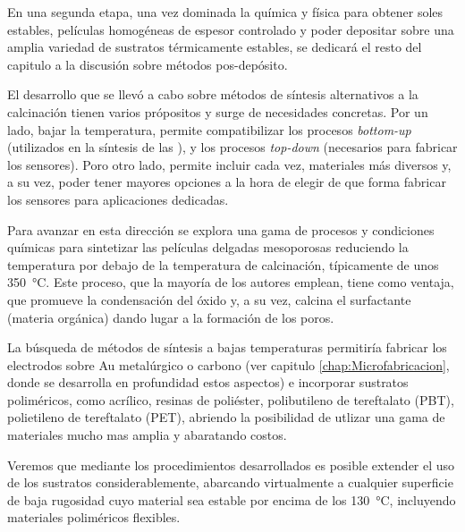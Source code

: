 	En una segunda etapa, una vez dominada la química y física para obtener soles estables, películas homogéneas de espesor controlado y poder depositar sobre una amplia variedad de sustratos térmicamente estables, se dedicará el resto del capitulo a la discusión sobre métodos pos-depósito. 

	El desarrollo que se llevó a cabo sobre métodos de síntesis alternativos a la calcinación tienen varios própositos y surge de necesidades concretas. Por un lado, bajar la temperatura, permite compatibilizar los procesos \textit{bottom-up} (utilizados en la síntesis de las \pdm), y los procesos \textit{top-down} (necesarios para fabricar los sensores). Poro otro lado, permite incluir cada vez, materiales más diversos y, a su vez, poder tener mayores opciones a la hora de elegir de que forma fabricar los sensores para aplicaciones dedicadas\cite{Doshi2000a,Wagner2013,Innocenzi2013,Soler-Illia2002a}.

	Para avanzar en esta dirección se explora una gama de procesos y condiciones químicas para sintetizar las películas delgadas mesoporosas reduciendo la temperatura por debajo de la temperatura de calcinación, típicamente de unos \SI{350}{\celsius}. Este proceso, que la mayoría de los autores emplean, tiene como ventaja, que promueve la condensación del óxido y, a su vez, calcina el surfactante (materia orgánica) dando lugar a la formación de los poros.\cite{Zhang2015,Horiuchi2011,Clark2000,Zhang2005}

	La búsqueda de métodos de síntesis a bajas temperaturas permitiría fabricar los electrodos sobre Au metalúrgico o carbono (ver capitulo \ref{chap:Microfabricacion}, donde se desarrolla en profundidad estos aspectos) e incorporar sustratos poliméricos, como acrílico, resinas de poliéster, polibutileno de tereftalato (PBT), polietileno de tereftalato (PET), abriendo la posibilidad de utlizar una gama de materiales mucho mas amplia y abaratando costos.

	Veremos que mediante los procedimientos desarrollados es posible extender el uso de los sustratos considerablemente, abarcando virtualmente a cualquier superficie de baja rugosidad cuyo material sea estable por encima de los \SI{130}{\celsius}, incluyendo materiales poliméricos flexibles.
		
